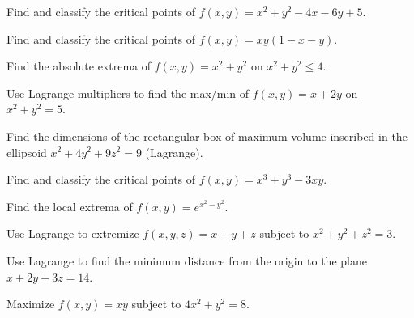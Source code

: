 \documentclass[11pt]{article}
\begin{document}
\begin{problems}
\item Find and classify the critical points of $f(x,y) = x^2 + y^2 - 4x - 6y + 5$.
\item Find and classify the critical points of $f(x,y) = xy(1 - x - y)$.
\item Find the absolute extrema of $f(x,y) = x^2 + y^2$ on $x^2 + y^2 \le 4$.
\item Use Lagrange multipliers to find the max/min of $f(x,y) = x + 2y$ on $x^2 + y^2 = 5$.
\item Find the dimensions of the rectangular box of maximum volume inscribed in the ellipsoid $x^2 + 4y^2 + 9z^2 = 9$ (Lagrange).
\end{problems}

\vfill
\newpage
{}
\begin{problems}
\item Find and classify the critical points of $f(x,y) = x^3 + y^3 - 3xy$.
\item Find the local extrema of $f(x,y) = e^{x^2 - y^2}$.
\item Use Lagrange to extremize $f(x,y,z) = x + y + z$ subject to $x^2 + y^2 + z^2 = 3$.
\item Use Lagrange to find the minimum distance from the origin to the plane $x + 2y + 3z = 14$.
\item Maximize $f(x,y) = xy$ subject to $4x^2 + y^2 = 8$.
\end{problems}

\vfill
\newpage
{}
\end{document}
